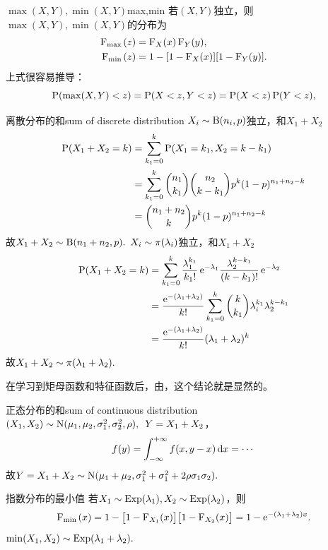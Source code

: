 \begin{example}{$\max(X,Y),\min(X,Y)$}{max,min}
	若$(X,Y)$独立，则$\max(X,Y),\min(X,Y)$的分布为
	\begin{subequations}
		\label{eq:min-max distribution}
		\begin{align}
			\CDF_{\max{}}(z)&=\CDF_X(x)\CDF_Y(y),\\
			\CDF_{\min{}}(z)&=1-[1-\CDF_X(x)][1-\CDF_Y(y)].
		\end{align}
	\end{subequations}
	上式很容易推导：
	\[
		\P(\max(X,Y)<z)=\P(X<z,Y<z)=\P(X<z)\P(Y<z),
	\]
\end{example}
\begin{example}{离散分布的和}{sum of discrete distribution}
	$X_i\sim\Bino(n_i,p)$独立，和$X_1+X_2$
	\begin{align*}
		\P(X_1+X_2=k)&=\sum_{k_1=0}^k\P(X_1=k_1,X_2=k-k_1)\\
		&=\sum_{k_1=0}^k\binom{n_1}{k_1}\binom{n_2}{k-k_1}p^k(1-p)^{n_1+n_2-k}\\
		&=\binom{n_1+n_2}{k}p^k(1-p)^{n_1+n_2-k}
	\end{align*}
	故$X_1+X_2\sim\Bino(n_1+n_2,p).$
	\tcblower
	$X_i\sim\Pois(\lambda_i)$独立，和$X_1+X_2$
	\begin{align*}
		\P(X_1+X_2=k)&=\sum_{k_1=0}^k\frac{\lambda_1^{k_1}}{k_1!}\e{-\lambda_1}\frac{\lambda_2^{k-k_1}}{(k-k_1)!}\e{-\lambda_2}\\
		&=\frac{\e{-(\lambda_1+\lambda_2)}}{k!}\sum_{k_1=0}^k\binom{k}{k_1}\lambda_i^{k_1}\lambda_2^{k-k_1}\\
		&=\frac{\e{-(\lambda_1+\lambda_2)}}{k!}(\lambda_1+\lambda_2)^k
	\end{align*}
	故$X_1+X_2\sim\Pois(\lambda_1+\lambda_2).$
\end{example}
\begin{remark}
	在学习到矩母函数和特征函数后，由，这个结论就是显然的。
\end{remark}
\begin{example}{正态分布的和}{sum of continuous distribution}
	$(X_1,X_2)\sim\Norm(\mu_1,\mu_2,\sigma_1^2,\sigma_2^2,\rho),\enspace Y=X_1+X_2$，
	\[
		f(y)=\int\iti f(x, y-x)\d x=\cdots
	\]
	故$Y=X_1+X_2\sim\Norm(\mu_1+\mu_2,\sigma_1^2+\sigma_1^2+2\rho\sigma_1\sigma_2).$
\end{example}
\begin{example}{指数分布的最小值}{}
	若$X_1\sim\Expo(\lambda_1),X_2\sim\Expo(\lambda_2)$，则 
	\[
		\CDF_{\min{}}(x)=1-\bigfkh{1-\CDF_{X_1}(x)}\bigfkh{1-\CDF_{X_2}(x)}=1-\e{-(\lambda_1+\lambda_2)x}.
	\]
	$\min(X_1,X_2)\sim\Expo(\lambda_1+\lambda_2).$
\end{example}
